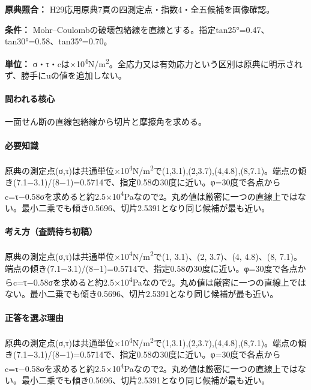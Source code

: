 \noindent\textbf{原典照合：} H29応用原典7頁の四測定点・指数4・全五候補を画像確認。\par

\noindent\textbf{条件：} Mohr–Coulombの破壊包絡線を直線とする。指定tan25°=0.47、tan30°=0.58、tan35°=0.70。\par

\noindent\textbf{単位：} σ・τ・cは×10\textsuperscript{4}N/m\textsuperscript{2}。全応力又は有効応力という区別は原典に明示されず、勝手にuの値を追加しない。\par

\paragraph{問われる核心} 一面せん断の直線包絡線から切片と摩擦角を求める。

\paragraph{必要知識} 原典の測定点(σ,τ)は共通単位×10\textsuperscript{4}N/m\textsuperscript{2}で(1,3.1),(2,3.7),(4,4.8),(8,7.1)。端点の傾き(7.1−3.1)/(8−1)=\allowbreak{}0.5714で、指定0.58の30度に近い。φ=30度で各点からc=τ−0.58σを求めると約2.5×10\textsuperscript{4}Paなので2。丸め値は厳密に一つの直線上ではない。最小二乗でも傾き0.5696、切片2.5391となり同じ候補が最も近い。

\paragraph{考え方（査読待ち初稿）} 原典の測定点(σ,τ)は共通単位×10\textsuperscript{4}N/m\textsuperscript{2}で(1, 3.1)、(2, 3.7)、(4, 4.8)、(8, 7.1)。端点の傾き(7.1−3.1)/(8−1)=\allowbreak{}0.5714で、指定0.58の30度に近い。φ=30度で各点からc=τ−0.58σを求めると約2.5×10\textsuperscript{4}Paなので2。丸め値は厳密に一つの直線上ではない。最小二乗でも傾き0.5696、切片2.5391となり同じ候補が最も近い。

\paragraph{正答を選ぶ理由} 原典の測定点(σ,τ)は共通単位×10\textsuperscript{4}N/m\textsuperscript{2}で(1,3.1),(2,3.7),(4,4.8),(8,7.1)。端点の傾き(7.1−3.1)/(8−1)=\allowbreak{}0.5714で、指定0.58の30度に近い。φ=30度で各点からc=τ−0.58σを求めると約2.5×10\textsuperscript{4}Paなので2。丸め値は厳密に一つの直線上ではない。最小二乗でも傾き0.5696、切片2.5391となり同じ候補が最も近い。

